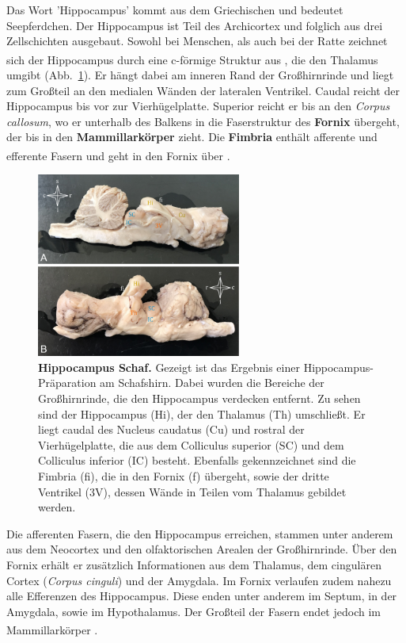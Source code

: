 \documentclass[12pt,a4paper,pdftex]{article}
\begin{document}
Das Wort 'Hippocampus' kommt aus dem Griechischen und bedeutet Seepferdchen. Der Hippocampus ist Teil des Archicortex und folglich aus drei Zellschichten ausgebaut. Sowohl bei Menschen, als auch bei der Ratte zeichnet sich der Hippocampus durch eine c-förmige Struktur aus \textsuperscript{\cite[20]{paxinos2014rat}}, die den Thalamus umgibt (Abb.~\ref{fig:hippocampus_schaf}). Er hängt dabei am inneren Rand der Großhirnrinde und liegt zum Großteil an den medialen Wänden der lateralen Ventrikel. Caudal reicht der Hippocampus bis vor zur Vierhügelplatte. Superior reicht er bis an den \textit{Corpus callosum}, wo er unterhalb des Balkens in die Faserstruktur des \textbf{Fornix} übergeht, der bis in den \textbf{Mammillarkörper} zieht. Die \textbf{Fimbria} enthält afferente und efferente Fasern und geht in den Fornix über \textsuperscript{\cite[9]{trepel2011neuroanatomie}}.\\

\begin{figure}[H]
    \centering
    \includegraphics[width=0.6\textwidth]{pictures/Bilder_Jule/Schaf/Ausschnitte/hippocampus_schaf.png}
    \caption[Hippocampus Schaf]{\textbf{Hippocampus Schaf.} Gezeigt ist das Ergebnis einer Hippocampus-Präparation am Schafshirn. Dabei wurden die Bereiche der Großhirnrinde, die den Hippocampus verdecken entfernt. Zu sehen sind der Hippocampus (Hi), der den Thalamus (Th) umschließt. Er liegt caudal des Nucleus caudatus (Cu) und rostral der Vierhügelplatte, die aus dem Colliculus superior (SC) und dem Colliculus inferior (IC) besteht. Ebenfalls gekennzeichnet sind die Fimbria (fi), die in den Fornix (f) übergeht, sowie der dritte Ventrikel (3V), dessen Wände in Teilen vom Thalamus gebildet werden.}
    \label{fig:hippocampus_schaf}
\end{figure}{}

\noindent Die afferenten Fasern, die den Hippocampus erreichen, stammen unter anderem aus dem Neocortex und den olfaktorischen Arealen der Großhirnrinde. Über den Fornix erhält er zusätzlich Informationen aus dem Thalamus, dem cingulären Cortex (\textit{Corpus cinguli}) und der Amygdala. Im Fornix verlaufen zudem nahezu alle Efferenzen des Hippocampus. Diese enden unter anderem im Septum, in der Amygdala, sowie im Hypothalamus. Der Großteil der Fasern endet jedoch im Mammillarkörper \textsuperscript{\cite[9]{trepel2011neuroanatomie}}.\\
\end{document}
